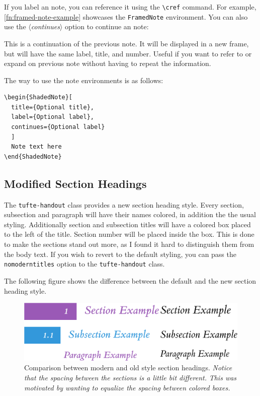 \documentclass[a4paper]{tufte-handout}
\newcommand{\hlorange}[1]{\textcolor{tufte-orange}{#1}}
\newcommand{\doccmd}[1]{\hlorange{\texttt{\textbackslash#1}}}
\newcommand{\docopt}[1]{\( \langle \)\textrm{\textit{#1}}\( \rangle \)}
\newcommand{\docenv}[1]{\hlorange{\texttt{#1}}}
\newcommand{\doccls}[1]{\texttt{#1}}
\newcommand{\docclsopt}[1]{\hlorange{\texttt{#1}}}
\begin{document}
If you label an note, you can reference it using the \doccmd{cref} command.
For example, \cref{fn:framed-note-example} showcases the \docenv{FramedNote} environment.
You can also use the \docopt{continues} option to continue an note:

\begin{FramedNote}[continues={fn:framed-note-example}]
  This is a continuation of the previous note. 
  It will be displayed in a new frame, but will have the same label, title, and number.
  Useful if you want to refer to or expand on previous note without having to repeat the information.
\end{FramedNote}

\noindent The way to use the note environments is as follows:
\begin{Verbatim}
\begin{ShadedNote}[
  title={Optional title}, 
  label={Optional label},
  continues={Optional label}
  ]
  Note text here
\end{ShadedNote}  
\end{Verbatim}


\subsection{Modified Section Headings}\label{ssec:modified-section-headings}
The \doccls{tufte-handout} class provides a new section heading style.
Every section, subsection and paragraph will have their names colored, in addition the the usual styling.
Additionally section and subsection titles will have a colored box placed to the left of the title.
Section number will be placed inside the box.
This is done to make the sections stand out more, as I found it hard to distinguish them from the body text.
If you wish to revert to the default styling, you can pass the \docclsopt{nomoderntitles} option to the \doccls{tufte-handout} class.

The following figure shows the difference between the default and the new section heading style.

\begin{figure}
  \includegraphics{section-comparison.png}
  \caption[Comparison between modern and old section styles]{%
    Comparison between modern and old style section headings.
    \emph{Notice that the spacing between the sections is a little bit different.}
    \emph{This was motivated by wanting to equalize the spacing between colored boxes.}
  }\label{fig:section-headings}
\end{figure}
\end{document}
